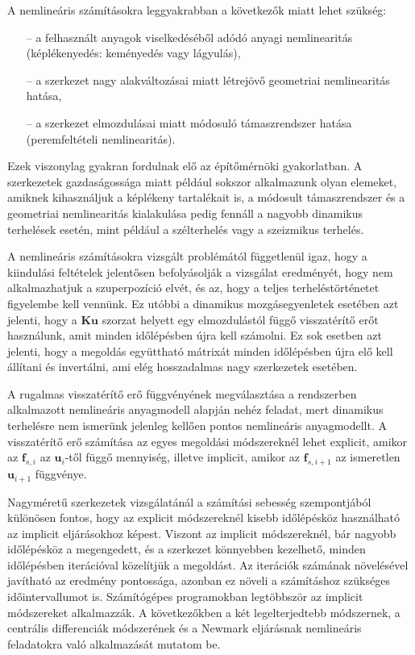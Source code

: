 A nemlineáris számításokra \cite{molnar} leggyakrabban a következők miatt lehet szükség:
\begin{itemize}
\item[--] a  felhasznált anyagok viselkedéséből adódó anyagi nemlinearitás (képlékenyedés: keményedés vagy 
lágyulás),
\item[--]  a szerkezet nagy alakváltozásai miatt létrejövő geometriai nemlinearitás hatása,
\item[--]  a szerkezet elmozdulásai miatt  módosuló  támaszrendszer hatása (peremfeltételi 
nemlinearitás).
\end{itemize}
Ezek viszonylag gyakran fordulnak elő az építőmérnöki gyakorlatban. A szerkezetek gazdaságossága miatt  például sokszor alkalmazunk olyan elemeket, amiknek kihasználjuk a képlékeny tartalékait is, a módosult támaszrendszer és a geometriai nemlinearitás kialakulása pedig fennáll a nagyobb dinamikus terhelések esetén, mint például a szélterhelés vagy a szeizmikus terhelés.

A nemlineáris számításokra vizsgált problémától függetlenül igaz, hogy a kiindulási feltételek jelentősen befolyásolják a vizsgálat eredményét, hogy nem alkalmazhatjuk a szuperpozíció elvét, és az, hogy  a teljes terheléstörténetet figyelembe kell vennünk. Ez utóbbi a dinamikus mozgásegyenletek esetében azt jelenti, hogy a $\mathbf{K}\mathbf{u}$ szorzat helyett egy elmozdulástól függő visszatérítő erőt használunk, amit minden időlépésben újra kell számolni. Ez sok esetben azt jelenti, hogy a megoldás együttható mátrixát minden időlépésben újra elő kell állítani és invertálni, ami elég hosszadalmas nagy szerkezetek esetében.

A rugalmas visszatérítő erő függvényének megválasztása a rendszerben alkalmazott nemlineáris anyagmodell alapján nehéz feladat, mert dinamikus terhelésre nem ismerünk jelenleg kellően pontos nemlineáris anyagmodellt. A visszatérítő erő számítása az egyes megoldási módszereknél lehet explicit, amikor  az $\mathbf{f}_{s,i}$ az $\mathbf{u}_i$-től függő mennyiség, illetve implicit, amikor az $\mathbf{f}_{s,i+1}$ az ismeretlen $\mathbf{u}_{i+1}$ függvénye. 

Nagyméretű szerkezetek vizsgálatánál a számítási sebesség szempontjából különösen fontos, hogy az explicit módszereknél kisebb időlépésköz használható az implicit eljárásokhoz képest. Viszont az implicit módszereknél, bár nagyobb időlépésköz a megengedett, és a szerkezet könnyebben kezelhető,  minden időlépésben iterációval közelítjük a megoldást. Az iterációk  számának  növelésével  javítható  az  eredmény  pontossága, azonban ez növeli a számításhoz szükséges időintervallumot is. Számítógépes programokban legtöbbször az implicit módszereket alkalmazzák. A következőkben a két legelterjedtebb módszernek, a centrális differenciák módszerének és a Newmark eljárásnak nemlineáris feladatokra való alkalmazását mutatom be.  





